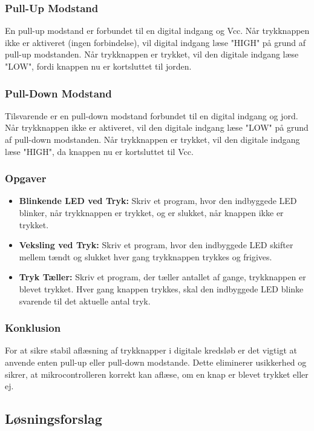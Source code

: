 \subsubsection*{Pull-Up Modstand}
En pull-up modstand er forbundet til en digital indgang og Vcc. Når trykknappen ikke er aktiveret (ingen forbindelse), vil digital indgang læse "HIGH" på grund af pull-up modstanden. Når trykknappen er trykket, vil den digitale indgang læse "LOW", fordi knappen nu er kortsluttet til jorden.

\subsubsection*{Pull-Down Modstand}
Tilsvarende er en pull-down modstand forbundet til en digital indgang og jord. Når trykknappen ikke er aktiveret, vil den digitale indgang læse "LOW" på grund af pull-down modstanden. Når trykknappen er trykket, vil den digitale indgang læse "HIGH", da knappen nu er kortsluttet til Vcc.

\subsubsection*{Opgaver}
\begin{itemize}
	\item \textbf{Blinkende LED ved Tryk:} Skriv et program, hvor den indbyggede LED blinker, når trykknappen er trykket, og er slukket, når knappen ikke er trykket.
	\item \textbf{Veksling ved Tryk:} Skriv et program, hvor den indbyggede LED skifter mellem tændt og slukket hver gang trykknappen trykkes og frigives.
	\item \textbf{Tryk Tæller:} Skriv et program, der tæller antallet af gange, trykknappen er blevet trykket. Hver gang knappen trykkes, skal den indbyggede LED blinke svarende til det aktuelle antal tryk.
\end{itemize}

\subsubsection*{Konklusion}
For at sikre stabil aflæsning af trykknapper i digitale kredsløb er det vigtigt at anvende enten pull-up eller pull-down modstande. Dette eliminerer usikkerhed og sikrer, at mikrocontrolleren korrekt kan aflæse, om en knap er blevet trykket eller ej.

\clearpage

\subsection*{Løsningsforslag}

